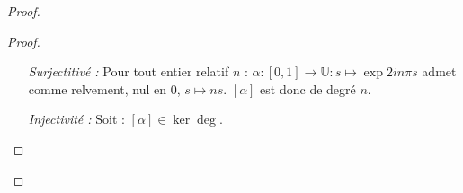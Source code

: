 \begin{proof}
\begin{proof}
\begin{itemize}
Rappelons que le lacet $\alpha\cdot\beta$ est d\'efini par :
\[
\begin{array}{rcccl}
\forall t\in&\left[0,\frac{1}{2}\right]&\alpha\cdot\beta (t)&=&\alpha (2t)\\[1ex]
\forall t\in&\left[\frac{1}{2},1\right]&\alpha\cdot\beta (t)&=&\beta (2t-1)
\end{array}
\]
Soient respectivement, $\tilde{alpha}$ et $\tilde{\beta}$ les relvements de $\alpha$ et $\beta$ qui valent $0$ en $0$. Soit de plus $\tilde{\gamma}$ le chemin d\'efini par :
\[
\begin{array}{rcccl}
\forall t\in&\left[0,\frac{1}{2}\right]&\tilde{\gamma} (t)&=&\tilde{\alpha} (2t)\\[1ex]
\forall t\in&\left[\frac{1}{2},1\right]&\tilde{\gamma} (t)&=&\tilde{\alpha}(1)+\tilde{\beta} (2t-1)
\end{array}
\]
Pa recollement, $\tilde{\gamma}$ est continu. On remarque de plus que : $\tilde{\gamma}(1)=\tilde{\alpha}(1)+\tilde{\beta}(1)$.

Montrons maintenant que $\tilde{\gamma}$ est un rel\`evement dans $\mathbb{R}$ de $\alpha\cdot\beta$, qui prend la valeur $0$ en $0$.

La deuxime proposition est \'evidente.

Par d\'efinition de $\tilde{\gamma}$ et $\tilde{\alpha}$ : $\forall t\in\left[0,\frac{1}{2}\right],\exp (2i\pi\tilde{\gamma}(t))=\alpha (2t)$ donc %
.

Par ailleurs, puisque $\exp (2i\pi\tilde{\alpha}(1))=1$,

$\tilde{\alpha}(1)\in\mathbb{Z}$ donc : %
\[\forall t\in\left[\frac{1}{2},1\right]\exp (2i\pi(\tilde{\beta}(2t-1)+\tilde{\alpha}(1)))=\exp(2i\pi\tilde{\beta}(2t-1))\]
donc : $\forall t\in\left[\frac{1}{2},1\right],\exp (2i\pi \tilde{\gamma}(t))=\beta (2t-1)$
autrement dit : 

Nous avons montr\'e la propri\'et\'e de rel\`evement pour $\tilde{\gamma}$.

Ainsi : $\tilde{\gamma}=\tilde{\alpha\cdot\beta}$, ce qui entra\^ine : $\tilde{\alpha\cdot\beta} (1)=\tilde{\alpha}(1)+\tilde{\beta}(1)$. Il s'ensuit que :
\[\deg [\alpha\cdot\beta ]=\deg [\alpha ]+\deg [\beta ]\]
\item[\textit{Surjectitiv\'e :}]
Pour tout entier relatif $n$ : $\alpha :[0,1]\rightarrow \mathbb{U}:s\mapsto \exp{2in\pi s}$ admet comme relvement, nul en $0$, $s\mapsto ns$. %
$[\alpha]$ est donc de degr\'e $n$.
\item[\textit{Injectivit\'e :}]
Soit : $[\alpha]\in\ker\deg$.


\end{itemize}
\end{proof}
\end{proof}
